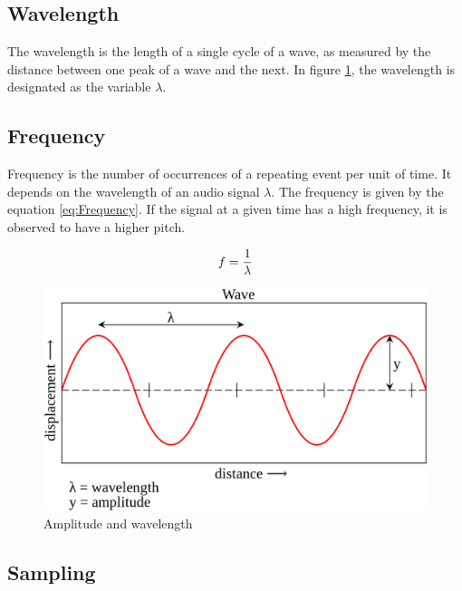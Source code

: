 \subsection{Wavelength}
\label{sub:Wavelength}

The wavelength is the length of a single cycle of a wave, as measured by the distance between one peak of a wave and the next. In figure \ref{fig:Amplitude-Wavelenght}, the wavelength is designated as the variable $\lambda$.

\subsection{Frequency}
\label{sub:Frequency}

Frequency is the number of occurrences of a repeating event per unit of time. It depends on the wavelength of an audio signal $\lambda$. The frequency is given by the equation \ref{eq:Frequency}. If the signal at a given time has a high frequency, it is observed to have a higher pitch.

\begin{equation}
    \centering
    f = \frac{1}{\lambda}
    \label{eq:Frequency}
\end{equation}

\begin{figure}[htbp]
	\centering
	\includegraphics[scale=0.25]{baa-documentation/img/Amplitude.png}
	\caption[Amplitude and wavelength illustrated]{Amplitude and wavelength \footnotemark}
	\label{fig:Amplitude-Wavelenght}
\end{figure}

\subsection{Sampling}
\label{sub:Sampling}

